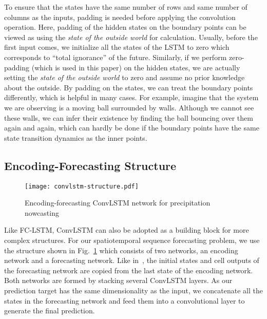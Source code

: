 \documentclass{article} \usepackage{amsmath}
\begin{document}
To ensure that the states have the same number of rows and same number of columns as the inputs, padding is needed before applying the convolution operation. Here, padding of the hidden states on the boundary points can be viewed as using the \emph{state of the outside world} for calculation. Usually, before the first input comes, we initialize all the states of the LSTM to zero which corresponds to ``total ignorance'' of the future. Similarly, if we perform zero-padding (which is used in this paper) on the hidden states, we are actually setting the \emph{state of the outside world} to zero and assume no prior knowledge about the outside. By padding on the states, we can treat the boundary points differently, which is helpful in many cases.  For example, imagine that the system we are observing is a moving ball surrounded by walls. Although we cannot see these walls, we can infer their existence by finding the ball bouncing over them again and again, which can hardly be done if the boundary points have the same state transition dynamics as the inner points.


\subsection{Encoding-Forecasting Structure}
\begin{figure}[!tb]
\begin{center}
\texttt{[image: convlstm-structure.pdf]}
\end{center}
\vspace{-1em}
\caption{Encoding-forecasting ConvLSTM network for precipitation nowcasting}
\vspace{-0.5em}
\label{fig:convlstm-encoding-forecasting}
\end{figure}

Like FC-LSTM, ConvLSTM can also be adopted as a building block for more complex structures. For our spatiotemporal sequence forecasting problem, we use the structure shown in Fig.~\ref{fig:convlstm-encoding-forecasting} which consists of two networks, an encoding network and a forecasting network. Like in~\cite{srivastava2015unsupervised}, the initial states and cell outputs of the forecasting network are copied from the last state of the encoding network. Both networks are formed by stacking several ConvLSTM layers. As our prediction target has the same dimensionality as the input, we concatenate all the states in the forecasting network and feed them into a  convolutional layer to generate the final prediction.
\end{document}
